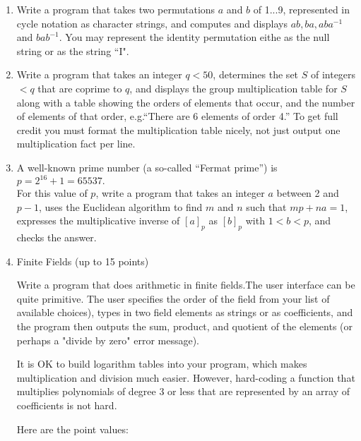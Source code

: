 \documentclass[12pt]{article}
\begin{document}
\begin{enumerate}
\item Write a program that takes two permutations $a$ and $b$ of 1...9, represented in cycle notation as character strings, and computes and displays $ab, ba, aba^{-1}$ and $bab^{-1}$.
You may represent the identity permutation eithe as the null string or as the string ``I".

\item Write a program that takes an integer $q < 50$, determines the set $S$ of integers $< q$ that are coprime to $q$, and displays the group multiplication table for $S$ along with a table showing the orders of elements that occur, and the number of elements of that order, e.g.``There are 6 elements of order 4.'' To get full credit you must format the multiplication table nicely, not just output one  multiplication fact per line.

\item A well-known prime number (a so-called ``Fermat prime'') is \\$p = 2^{16}+1 = 65537.$\\ For this value of $p$, write a program that takes an integer $a$ between 2 and $p-1$, uses the Euclidean algorithm to find $m$ and $n$ such that $mp + na = 1$, expresses the multiplicative inverse of $[a]_p$ as $[b]_p$ with $1 < b < p$, and checks the answer.

\pagebreak

\item Finite Fields (up to 15 points)

Write a program that does arithmetic in finite fields.The user interface can be quite primitive.
The user specifies the order of the field from your list of available choices), types in two field elements as strings or as coefficients, and the program then outputs the sum, product, and quotient of the elements (or perhaps a "divide by zero" error message).

It is OK to build logarithm tables into your program, which makes multiplication and division much easier. However, hard-coding a function that multiplies polynomials of degree 3 or less that are represented by an array of coefficients is not hard.

Here are the point values:


\end{enumerate}
\end{document}
